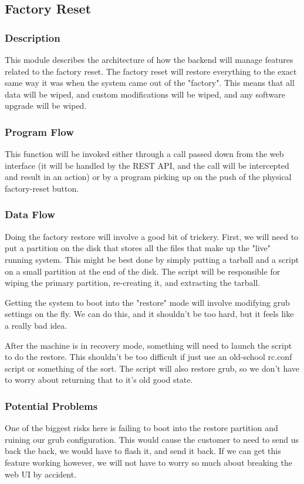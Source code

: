 
\subsection{Factory Reset}

\subsubsection{Description}

This module describes the architecture of how the backend will manage features related to the factory reset.
The factory reset will restore everything to the exact same way it was when the system came out of the "factory".
This means that all data will be wiped, and custom modifications will be wiped, and any software upgrade will be wiped.

\subsubsection{Program Flow}

This function will be invoked either through a call passed down from the web interface (it will be handled by the REST API, and the call will be intercepted and result in an action) or by a program picking up on the push of the physical factory-reset button.

\subsubsection{Data Flow}

Doing the factory restore will involve a good bit of trickery. 
First, we will need to put a partition on the disk that stores all the files that make up the "live" running system. 
This might be best done by simply putting a tarball and a script on a small partition at the end of the disk. 
The script will be responsible for wiping the primary partition, re-creating it, and extracting the tarball.

Getting the system to boot into the "restore" mode will involve modifying grub settings on the fly. 
We can do this, and it shouldn't be too hard, but it feels like a really bad idea.

After the machine is in recovery mode, something will need to launch the script to do the restore.
This shouldn't be too difficult if just use an old-school rc.conf script or something of the sort.
The script will also restore grub, so we don't have to worry about returning that to it's old good state.

\subsubsection{Potential Problems}

One of the biggest risks here is failing to boot into the restore partition and ruining our grub configuration.
This would cause the customer to need to send us back the back, we would have to flash it, and send it back.
If we can get this feature working however, we will not have to worry so much about breaking the web UI by accident.
